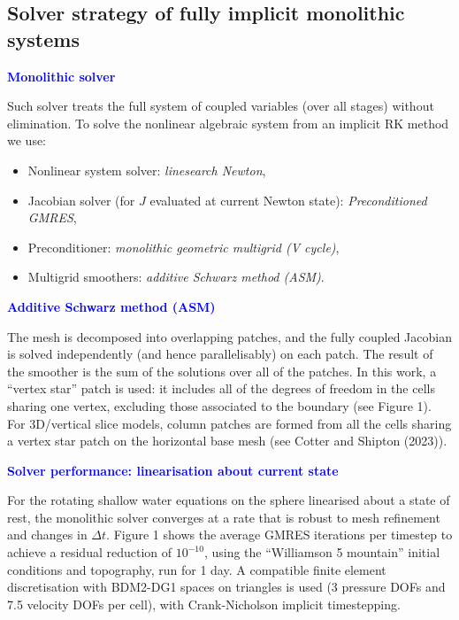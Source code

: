 \documentclass[a4paper,10pt]{article}
\begin{document}
\subsection{Solver strategy of fully implicit monolithic systems}

\noindent \textcolor{blue}{\textbf{Monolithic solver}}

  Such solver treats the full system of coupled variables (over all stages)
  without elimination. To solve the nonlinear algebraic system from an
  implicit RK method we use:
  \begin{itemize}
  \item Nonlinear system solver: \emph{linesearch Newton},
  \item Jacobian solver (for $J$ evaluated at current Newton state):
    \emph{Preconditioned GMRES},
  \item Preconditioner: \emph{monolithic geometric multigrid (V cycle)},
  \item Multigrid smoothers: \emph{additive Schwarz method (ASM)}.
  \end{itemize}

\vspace{0.7cm}

\noindent \textcolor{blue}{\textbf{Additive Schwarz method (ASM)}}

The mesh is decomposed
  into overlapping patches, and the fully coupled Jacobian is solved
  independently (and hence parallelisably) on each patch. The result
  of the smoother is the sum of the solutions over all of the
  patches. In this work, a ``vertex star'' patch is used: it includes
  all of the degrees of freedom in the cells sharing one vertex,
  excluding those associated to the boundary (see Figure 1). For
  3D/vertical slice models, column patches are formed from all the
  cells sharing a vertex star patch on the horizontal base mesh (see
  Cotter and Shipton (2023)).


\vspace{0.7cm}


\noindent \textcolor{blue}{\textbf{Solver performance: linearisation about current state}}

  For the rotating shallow water equations on the sphere linearised
  about a state of rest, the monolithic solver converges at a rate
  that is robust to mesh refinement and changes in $\Delta t$. Figure
  1 shows the average GMRES iterations per timestep to achieve a
  residual reduction of $10^{-10}$, using the ``Williamson 5
  mountain'' initial conditions and topography, run for 1 day. A
  compatible finite element discretisation with BDM2-DG1 spaces on
  triangles is used (3 pressure DOFs and 7.5 velocity DOFs per cell), with Crank-Nicholson
  implicit timestepping.
\end{document}
